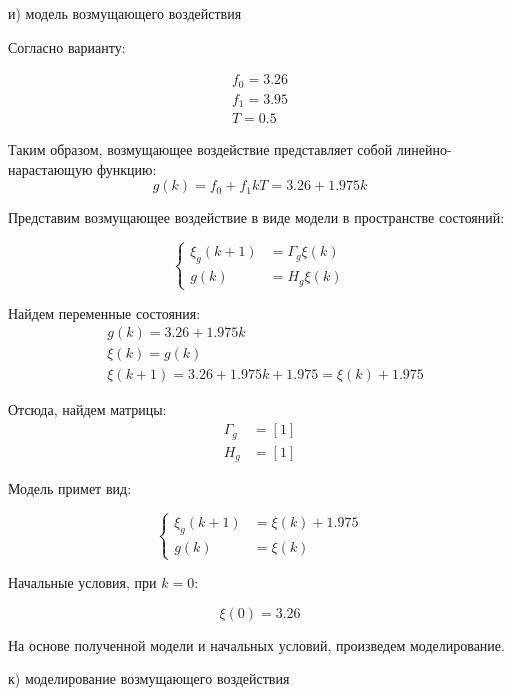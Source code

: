 \documentclass[a4paper,14pt]{extreport}
\begin{document}
и) модель возмущающего воздействия

Согласно варианту:

\begin{eqnarray}
f_0 = 3.26\\
f_1 = 3.95\\
T = 0.5
\end{eqnarray}

Таким образом, возмущающее воздействие представляет собой линейно-нарастающую функцию:
\begin{equation}
	g(k) = f_0 + f_1 k T = 3.26 + 1.975 k
\end{equation}

Представим возмущающее воздействие в виде модели в пространстве состояний:

\begin{equation}
\begin{cases}
	\xi_g (k+1) &= \Gamma_g \xi(k)\\
	g(k) &= H_g \xi (k)
\end{cases}
\end{equation}

Найдем переменные состояния:
\begin{eqnarray}
&g(k) = 3.26 + 1.975 k \\
&\xi (k) = g(k)\\
&\xi (k+1) = 3.26 + 1.975 k + 1.975 = \xi (k) + 1.975
\end{eqnarray}

Отсюда, найдем матрицы:
\begin{eqnarray}
	\Gamma_g &= [1]\\
	H_g &= [1]
\end{eqnarray}

Модель примет вид:

\begin{equation}
\begin{cases}
\xi_g (k+1) &= \xi(k) + 1.975\\
g(k) &= \xi (k)
\end{cases}
\end{equation}

Начальные условия, при $k = 0$:

\begin{equation}
	\xi (0) = 3.26
\end{equation}

На основе полученной модели и начальных условий, произведем моделирование.

к) моделирование возмущающего воздействия
\end{document}
